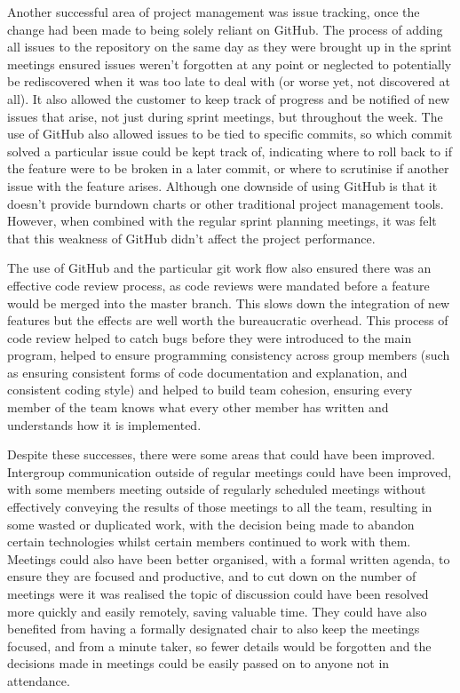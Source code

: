 \documentclass[a4paper, 12pt, twoside]{article}
\begin{document}
Another successful area of project management was issue tracking, once the change had been made to being solely reliant on GitHub. The process of adding all issues to the repository on the same day as they were brought up in the sprint meetings ensured issues weren't forgotten at any point or neglected to potentially be rediscovered when it was too late to deal with (or worse yet, not discovered at all). It also allowed the customer to keep track of progress and be notified of new issues that arise, not just during sprint meetings, but throughout the week. The use of GitHub also allowed issues to be tied to specific commits, so which commit solved a particular issue could be kept track of, indicating where to roll back to if the feature were to be broken in a later commit, or where to scrutinise if another issue with the feature arises. Although one downside of using GitHub is that it doesn't provide burndown charts or other traditional project management tools. However, when combined with the regular sprint planning meetings, it was felt that this weakness of GitHub didn't affect the project performance.

The use of GitHub and the particular git work flow also ensured there was an effective code review process, as code reviews were mandated before a feature would be merged into the master branch. This slows down the integration of new features but the effects are well worth the bureaucratic overhead. This process of code review helped to catch bugs before they were introduced to the main program, helped to ensure programming consistency across group members (such as ensuring consistent forms of code documentation and explanation, and consistent coding style) and helped to build team cohesion, ensuring every member of the team knows what every other member has written and understands how it is implemented.

Despite these successes, there were some areas that could have been improved. Intergroup communication outside of regular meetings could have been improved, with some members meeting outside of regularly scheduled meetings without effectively conveying the results of those meetings to all the team, resulting in some wasted or duplicated work, with the decision being made to abandon certain technologies whilst certain members continued to work with them. Meetings could also have been better organised, with a formal written agenda, to ensure they are focused and productive, and to cut down on the number of meetings were it was realised the topic of discussion could have been resolved more quickly and easily remotely, saving valuable time. They could have also benefited from having a formally designated chair to also keep the meetings focused, and from a  minute taker, so fewer details would be forgotten and the decisions made in meetings could be easily passed on to anyone not in attendance.
\end{document}
